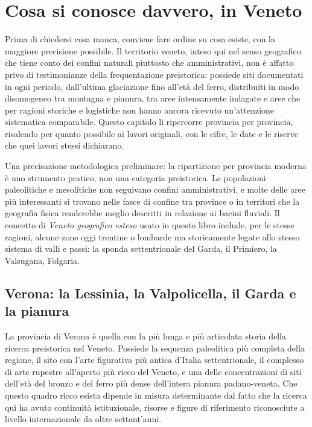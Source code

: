 \chapter{Cosa si conosce davvero, in Veneto}
\label{cap:cosa_si_conosce}

Prima di chiedersi cosa manca, conviene fare ordine su cosa esiste, con la maggiore precisione possibile. Il territorio veneto, inteso qui nel senso geografico che tiene conto dei confini naturali piuttosto che amministrativi, non è affatto privo di testimonianze della frequentazione preistorica: possiede siti documentati in ogni periodo, dall'ultima glaciazione fino all'età del ferro, distribuiti in modo disomogeneo tra montagna e pianura, tra aree intensamente indagate e aree che per ragioni storiche e logistiche non hanno ancora ricevuto un'attenzione sistematica comparabile. Questo capitolo li ripercorre provincia per provincia, risalendo per quanto possibile ai lavori originali, con le cifre, le date e le riserve che quei lavori stessi dichiarano.

Una precisazione metodologica preliminare: la ripartizione per provincia moderna è uno strumento pratico, non una categoria preistorica. Le popolazioni paleolitiche e mesolitiche non seguivano confini amministrativi, e molte delle aree più interessanti si trovano nelle fasce di confine tra province o in territori che la geografia fisica renderebbe meglio descritti in relazione ai bacini fluviali. Il concetto di \emph{Veneto geografico esteso} usato in questo libro include, per le stesse ragioni, alcune zone oggi trentine o lombarde ma storicamente legate allo stesso sistema di valli e passi: la sponda settentrionale del Garda, il Primiero, la Valsugana, Folgaria.

\section{Verona: la Lessinia, la Valpolicella, il Garda e la pianura}

La provincia di Verona è quella con la più lunga e più articolata storia della ricerca preistorica nel Veneto. Possiede la sequenza paleolitica più completa della regione, il sito con l'arte figurativa più antica d'Italia settentrionale, il complesso di arte rupestre all'aperto più ricco del Veneto, e una delle concentrazioni di siti dell'età del bronzo e del ferro più dense dell'intera pianura padano-veneta. Che questo quadro ricco esista dipende in misura determinante dal fatto che la ricerca qui ha avuto continuità istituzionale, risorse e figure di riferimento riconosciute a livello internazionale da oltre settant'anni.

